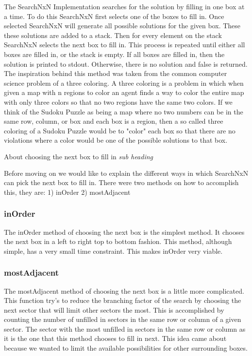 \documentclass[letterpaper]{article}
\begin{document}
The SearchNxN Implementation searches for the solution by filling in one box at a time. To do this SearchNxN first selects one of the boxes to fill in. Once selected SearchNxN will generate all possible solutions for the given box. These these solutions are added to a stack. Then for every element on the stack SearchNxN selects the next box to fill in. This process is repeated until either all boxes are filled in, or the stack is empty. If all boxes are filled in, then the solution is printed to stdout. Otherwise, there is no solution and false is returned. The inspiration behind this method was taken from the common computer science problem of a three coloring. A three coloring is a problem in which when given a map with n regions to color an agent finds a way to color the entire map with only three colors so that no two regions have the same two colors. If we think of the Sudoku Puzzle as being a map where no two numbers can be in the same row, column, or box and each box is a region, then a so called three coloring of a Sudoku Puzzle would be to "color" each box so that there are no violations where a color would be one of the possible solutions to that box.

About choosing the next box to fill in \emph{sub heading}

Before moving on we would like to explain the different ways in which SearchNxN can pick the next box to fill in. There were two methods on how to accomplish this, they are:
1) inOrder
2) mostAdjacent

\subsubsection{inOrder}

The inOrder method of choosing the next box is the simplest method. It chooses the next box in a left to right top to bottom fashion. This method, although simple, has a very small time constraint. This makes inOrder very viable.

\subsubsection{mostAdjacent}

The mostAdjacent method of choosing the next box is a little more complicated. This function try's to reduce the branching factor of the search by choosing the next sector that will limit other  sectors the most. This is accomplished by counting the number of unfilled in sectors in the same row or column of a given sector. The sector with the most unfilled in sectors in the same row or column as it is the one that this method chooses to fill in next. This idea came about because we wanted to limit the available possibilities for other surrounding boxes.
\end{document}
